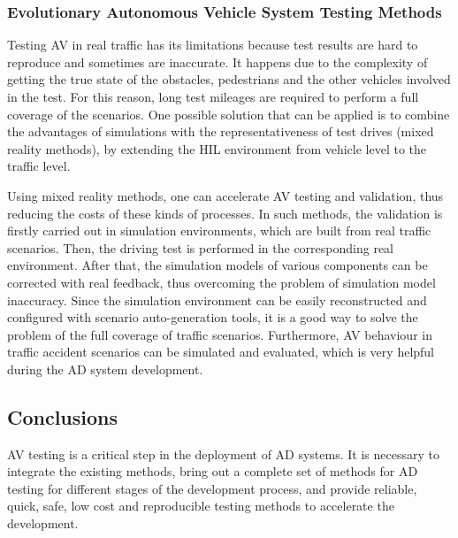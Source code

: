 \documentclass[a4paper, 10pt]{article}
\begin{document}
\subsubsection{Evolutionary Autonomous Vehicle System Testing Methods}
Testing AV in real traffic has its limitations because test results are hard to reproduce and sometimes are inaccurate. It happens due to the complexity of getting the true state of the obstacles, pedestrians and the other vehicles involved in the test. For this reason, long test mileages are required to perform a full coverage of the scenarios. One possible solution that can be applied is to combine the advantages of simulations with the representativeness of test drives (mixed reality methods), by extending the HIL environment from vehicle level to the traffic level.

Using mixed reality methods, one can accelerate AV testing and validation, thus reducing the costs of these kinds of processes. In such methods, the validation is firstly carried out in simulation environments, which are built from real traffic scenarios. Then, the driving test is performed in the corresponding real environment. After that, the simulation models of various components can be corrected with real feedback, thus overcoming the problem of simulation model inaccuracy. Since the simulation environment can be easily reconstructed and configured with scenario auto-generation tools, it is a good way to solve the problem of the full coverage of traffic scenarios. Furthermore, AV behaviour in traffic accident scenarios can be simulated and evaluated, which is very helpful during the AD system development.

\subsection{Conclusions}
AV testing is a critical step in the deployment of AD systems. It is necessary to integrate the existing methods, bring out a complete set of methods for AD testing for different stages of the development process, and provide reliable, quick, safe, low cost and reproducible testing methods to accelerate the development.
\end{document}
